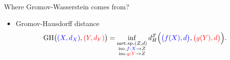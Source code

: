 \documentclass{beamer}
\newcommand{\gh}{\text{GH}}
\begin{document}
\begin{frame}{Where Gromov-Wasserstein comes from?}
\begin{minipage}[t]{0.6\linewidth}
\begin{itemize}
    \vspace{-0.4cm}
    \item Gromov-Hausdorff distance \parencite{Gromov81,Gromov99}
    \vspace{-0.3cm}
    \begin{align*}
      \gh \big( {\color{blue}{(X, d_X)}}, {\color{red}{(Y, d_Y)}} \big) =
      \inf_{\substack{\text{met.sp.}(Z, d) \\
      \text{iso.} {\color{blue}{f: X}} \to Z \\
      \text{iso.} {\color{red}{g: Y}} \to Z}}
      d_{H}^{Z} \Big( {\color{blue}{\big(f(X), d \big)}}, {\color{red}{\big(g(Y), d \big)}} \Big).
      \end{align*}
  \end{itemize}
  \end{minipage}%

  \hfill%
  \hspace{-6cm}
  \begin{minipage}[t]{0.5\linewidth}
\end{minipage}
\vspace{1cm}

\end{frame}
\end{document}
